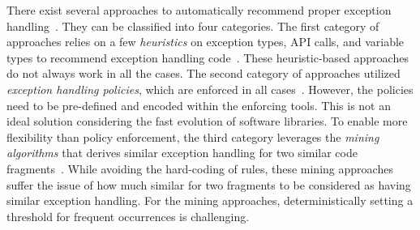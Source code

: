 There exist several approaches to automatically recommend proper
exception
handling~\cite{barbosa-bsse12,chanchal-scam14,barbosa-tse18,barbosa-tse16,xrank-fse20,throw-ase22}. They
can be classified into four categories. The first category of
approaches relies on a few {\em heuristics} on exception types, API
calls, and variable types to recommend exception handling
code~\cite{barbosa-bsse12}. These heuristic-based approaches do not
always work in all the cases. The second category of approaches
utilized {\em exception handling policies}, which are enforced in all
cases~\cite{barbosa-tse16,barbosa-saner18}. However, the policies need
to be pre-defined and encoded within the enforcing tools.  This is not
an ideal solution considering the fast evolution of software
libraries. To enable more flexibility than policy enforcement, the
third category leverages the {\em mining algorithms} that derives
similar exception handling for two similar code
fragments~\cite{chanchal-scam14}. While avoiding the hard-coding of
rules, these mining approaches suffer the issue of how much similar
for two fragments to be considered as having similar exception
handling. For the mining approaches, deterministically setting a
threshold for frequent occurrences is challenging.

